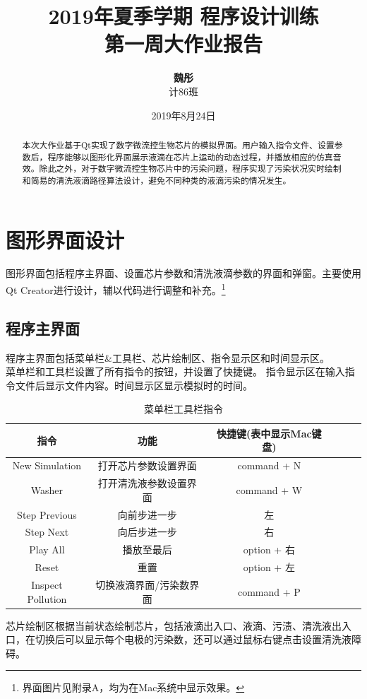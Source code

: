 \documentclass[12pt, a4paper]{article}
\title{\textbf{\LARGE 2019年夏季学期 \quad 程序设计训练 \\ 第一周大作业报告}}
\author{\textbf{魏彤} \\ 计86班 \quad 2018011417}
\date{2019年8月24日}
\begin{document}
	
	\maketitle
	
	\begin{abstract}
		本次大作业基于Qt实现了数字微流控生物芯片的模拟界面。用户输入指令文件、设置参数后，程序能够以图形化界面展示液滴在芯片上运动的动态过程，并播放相应的仿真音效。除此之外，对于数字微流控生物芯片中的污染问题，程序实现了污染状况实时绘制和简易的清洗液滴路径算法设计，避免不同种类的液滴污染的情况发生。
	\end{abstract}
	
	\section{图形界面设计}
		图形界面包括程序主界面、设置芯片参数和清洗液滴参数的界面和弹窗。主要使用Qt Creator进行设计，辅以代码进行调整和补充。\footnote{界面图片见附录A，均为在Mac系统中显示效果。}
		\subsection{程序主界面}
		程序主界面包括菜单栏\&工具栏、芯片绘制区、指令显示区和时间显示区。 \\
		
		菜单栏和工具栏设置了所有指令的按钮，并设置了快捷键。
		指令显示区在输入指令文件后显示文件内容。时间显示区显示模拟时的时间。
		\begin{table}  
			\centering  
			\caption{菜单栏工具栏指令}  
			\begin{tabular}  
				{cccccc}  
				\toprule[1pt]  
				指令 & 功能 & 快捷键(表中显示Mac键盘)  \\  
				\midrule  
				New Simulation    & 打开芯片参数设置界面      & command + N \\  
				Washer   	      & 打开清洗液参数设置界面    & command + W \\
				Step Previous     & 向前步进一步   	       & 左 \\
				Step Next	      & 向后步进一步			   & 右 \\
				Play All          & 播放至最后				& option + 右 \\
				Reset             & 重置				     & option + 左  \\
				Inspect Pollution & 切换液滴界面/污染数界面   & command + P \\
				\bottomrule[1pt]  
			\end{tabular}  
		\end{table}
		芯片绘制区根据当前状态绘制芯片，包括液滴出入口、液滴、污渍、清洗液出入口，在切换后可以显示每个电极的污染数，还可以通过鼠标右键点击设置清洗液障碍。
		
\end{document}
